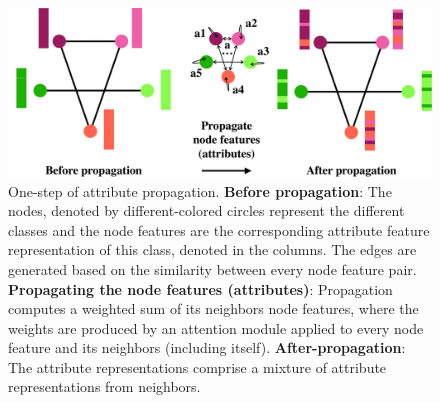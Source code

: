 \documentclass[letterpaper]{article} %
\def\vs{{\bm{s}}}
\begin{document}


\begin{figure}[t!]
\begin{center}
\includegraphics[width=\columnwidth]{prop-crop.pdf}
\end{center}
\caption{
One-step of attribute propagation. \textbf{Before propagation}: The nodes, denoted by different-colored circles represent the different classes and the node features are the corresponding attribute feature representation of this class, denoted in the columns. The edges are generated based on the similarity between every node feature pair. \textbf{Propagating the node features (attributes)}: Propagation computes a weighted sum of its neighbors node features, where the weights are produced by an attention module applied to every node feature and its neighbors (including itself). \textbf{After-propagation}: The attribute representations comprise a mixture of attribute representations from neighbors.
}
\label{fig:prop}
\end{figure}
\end{document}
